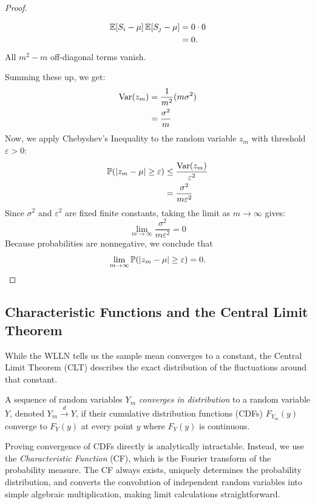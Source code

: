 \begin{proof}
\begin{itemize}
\[
\begin{aligned}
\operatorname{\mathbb{E}}[S_i - \mu]\operatorname{\mathbb{E}}[S_j - \mu] &= 0 \cdot 0 \\
&= 0.
\end{aligned}
\]
All $m^2 - m$ off-diagonal terms vanish.
\end{itemize}
Summing these up, we get:
\begin{equation}
\begin{aligned}
\operatorname{Var}(z_m) &= \frac{1}{m^2} (m \sigma^2) \\
&= \frac{\sigma^2}{m}
\end{aligned}
\end{equation}
Now, we apply Chebyshev's Inequality to the random variable $z_m$ with threshold $\varepsilon > 0$:
\begin{equation}
\begin{aligned}
\mathbb{P}(|z_m - \mu| \geq \varepsilon) &\leq \frac{\operatorname{Var}(z_m)}{\varepsilon^2} \\
&= \frac{\sigma^2}{m \varepsilon^2}
\end{aligned}
\end{equation}
Since $\sigma^2$ and $\varepsilon^2$ are fixed finite constants, taking the limit as $m \to \infty$ gives:
\begin{equation}
\lim_{m \to \infty} \frac{\sigma^2}{m \varepsilon^2} = 0
\end{equation}
Because probabilities are nonnegative, we conclude that
\[
\lim_{m \to \infty} \mathbb{P}(|z_m - \mu| \geq \varepsilon) = 0.
\]

\end{proof}

\subsection{Characteristic Functions and the Central Limit Theorem}


While the WLLN tells us the sample mean converges to a constant, the Central Limit Theorem (CLT) describes the exact distribution of the fluctuations around that constant.

\begin{definition}
A sequence of random variables $Y_m$ \textit{converges in distribution} to a random variable $Y$, denoted $Y_m \xrightarrow{d} Y$, if their cumulative distribution functions (CDFs) $F_{Y_m}(y)$ converge to $F_Y(y)$ at every point $y$ where $F_Y(y)$ is continuous.
\end{definition}

\begin{remark}
Proving convergence of CDFs directly is analytically intractable. Instead, we use the \textit{Characteristic Function} (CF), which is the Fourier transform of the probability measure. The CF always exists, uniquely determines the probability distribution, and converts the convolution of independent random variables into simple algebraic multiplication, making limit calculations straightforward.
\end{remark}

